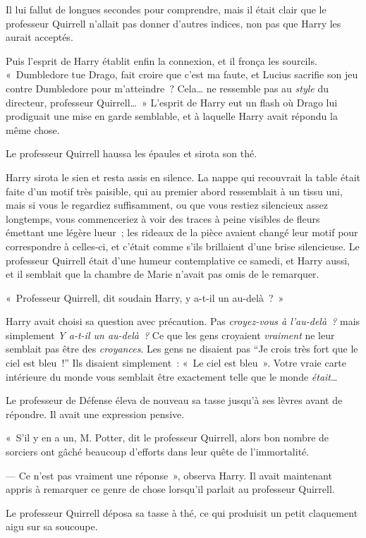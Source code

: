 Il lui fallut de longues secondes pour comprendre, mais il était clair que le professeur Quirrell n'allait pas donner d'autres indices, non pas que Harry les aurait acceptés.

Puis l'esprit de Harry établit enfin la connexion, et il fronça les sourcils. «~Dumbledore tue Drago, fait croire que c'est ma faute, et Lucius sacrifie son jeu contre Dumbledore pour m'atteindre~? Cela… ne ressemble pas au \emph{style} du directeur, professeur Quirrell…~» L'esprit de Harry eut un flash où Drago lui prodiguait une mise en garde semblable, et à laquelle Harry avait répondu la même chose.

Le professeur Quirrell haussa les épaules et sirota son thé.

Harry sirota le sien et resta assis en silence. La nappe qui recouvrait la table était faite d'un motif très paisible, qui au premier abord ressemblait à un tissu uni, mais si vous le regardiez suffisamment, ou que vous restiez silencieux assez longtemps, vous commenceriez à voir des traces à peine visibles de fleurs émettant une légère lueur~; les rideaux de la pièce avaient changé leur motif pour correspondre à celles-ci, et c'était comme s'ils brillaient d'une brise silencieuse. Le professeur Quirrell était d'une humeur contemplative ce samedi, et Harry aussi, et il semblait que la chambre de Marie n'avait pas omis de le remarquer.

«~Professeur Quirrell, dit soudain Harry, y a-t-il un au-delà~?~»

Harry avait choisi sa question avec précaution. Pas \emph{croyez-vous à l'au-delà~?} mais simplement \emph{Y a-t-il un au-delà~?} Ce que les gens croyaient \emph{vraiment} ne leur semblait pas être des \emph{croyances}. Les gens ne disaient pas “Je crois très fort que le ciel est bleu~!” Ils disaient simplement~: «~Le ciel est bleu~». Votre vraie carte intérieure du monde vous semblait être exactement telle que le monde \emph{était}…

Le professeur de Défense éleva de nouveau sa tasse jusqu'à ses lèvres avant de répondre. Il avait une expression pensive.

«~S'il y en a un, M. Potter, dit le professeur Quirrell, alors bon nombre de sorciers ont gâché beaucoup d'efforts dans leur quête de l'immortalité.

--- Ce n'est pas vraiment une réponse~», observa Harry. Il avait maintenant appris à remarquer ce genre de chose lorsqu'il parlait au professeur Quirrell.

Le professeur Quirrell déposa sa tasse à thé, ce qui produisit un petit claquement aigu sur sa soucoupe.

